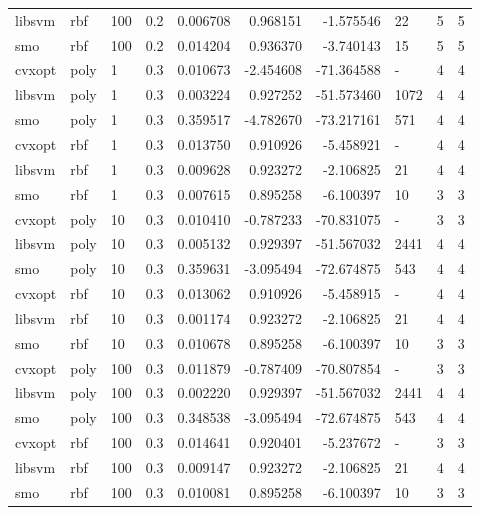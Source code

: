 \begin{tabular}{llllrrrlrr}
libsvm &    rbf & 100 &     0.2 &    0.006708 &   0.968151 &  -1.575546 &       22 &           5 &         5 \\
   smo &    rbf & 100 &     0.2 &    0.014204 &   0.936370 &  -3.740143 &       15 &           5 &         5 \\
cvxopt &   poly &   1 &     0.3 &    0.010673 &  -2.454608 & -71.364588 &        - &           4 &         4 \\
libsvm &   poly &   1 &     0.3 &    0.003224 &   0.927252 & -51.573460 &     1072 &           4 &         4 \\
   smo &   poly &   1 &     0.3 &    0.359517 &  -4.782670 & -73.217161 &      571 &           4 &         4 \\
cvxopt &    rbf &   1 &     0.3 &    0.013750 &   0.910926 &  -5.458921 &        - &           4 &         4 \\
libsvm &    rbf &   1 &     0.3 &    0.009628 &   0.923272 &  -2.106825 &       21 &           4 &         4 \\
   smo &    rbf &   1 &     0.3 &    0.007615 &   0.895258 &  -6.100397 &       10 &           3 &         3 \\
cvxopt &   poly &  10 &     0.3 &    0.010410 &  -0.787233 & -70.831075 &        - &           3 &         3 \\
libsvm &   poly &  10 &     0.3 &    0.005132 &   0.929397 & -51.567032 &     2441 &           4 &         4 \\
   smo &   poly &  10 &     0.3 &    0.359631 &  -3.095494 & -72.674875 &      543 &           4 &         4 \\
cvxopt &    rbf &  10 &     0.3 &    0.013062 &   0.910926 &  -5.458915 &        - &           4 &         4 \\
libsvm &    rbf &  10 &     0.3 &    0.001174 &   0.923272 &  -2.106825 &       21 &           4 &         4 \\
   smo &    rbf &  10 &     0.3 &    0.010678 &   0.895258 &  -6.100397 &       10 &           3 &         3 \\
cvxopt &   poly & 100 &     0.3 &    0.011879 &  -0.787409 & -70.807854 &        - &           3 &         3 \\
libsvm &   poly & 100 &     0.3 &    0.002220 &   0.929397 & -51.567032 &     2441 &           4 &         4 \\
   smo &   poly & 100 &     0.3 &    0.348538 &  -3.095494 & -72.674875 &      543 &           4 &         4 \\
cvxopt &    rbf & 100 &     0.3 &    0.014641 &   0.920401 &  -5.237672 &        - &           3 &         3 \\
libsvm &    rbf & 100 &     0.3 &    0.009147 &   0.923272 &  -2.106825 &       21 &           4 &         4 \\
   smo &    rbf & 100 &     0.3 &    0.010081 &   0.895258 &  -6.100397 &       10 &           3 &         3 \\
\bottomrule
\end{tabular}
